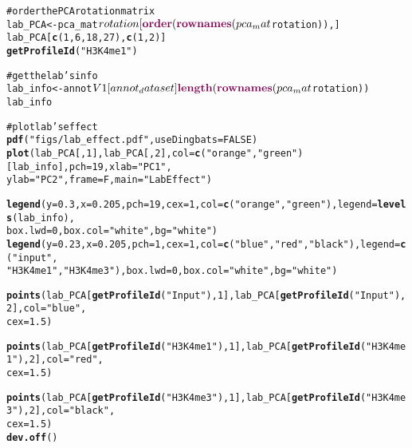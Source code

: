 \documentclass{article}\usepackage{graphicx, color}
\makeatletter
\newcommand{\hlfunctioncall}[1]{\textcolor[rgb]{0.501960784313725,0,0.329411764705882}{\textbf{#1}}}%
\newcommand{\hlstring}[1]{\textcolor[rgb]{0.6,0.6,1}{#1}}%
\newcommand{\hlcomment}[1]{\textcolor[rgb]{0.180392156862745,0.6,0.341176470588235}{#1}}%
\newenvironment{kframe}{%
 \def\at@end@of@kframe{}%
 \ifinner\ifhmode%
  \def\at@end@of@kframe{\end{minipage}}%
  \begin{minipage}{\columnwidth}%
 \fi\fi%
 \def\FrameCommand##1{\hskip\@totalleftmargin \hskip-\fboxsep
 \colorbox{shadecolor}{##1}\hskip-\fboxsep
     \hskip-\linewidth \hskip-\@totalleftmargin \hskip\columnwidth}%
 \MakeFramed {\advance\hsize-\width
   \@totalleftmargin\z@ \linewidth\hsize
   \@setminipage}}%
 {\par\unskip\endMakeFramed%
 \at@end@of@kframe}
\newenvironment{knitrout}{}{} %
\makeatother
\begin{document}
\begin{knitrout}
\color{fgcolor}\begin{kframe}
\begin{alltt}
\hlcomment{# order the PCA rotation matrix}
lab_PCA <- pca_mat$rotation[\hlfunctioncall{order}(\hlfunctioncall{rownames}(pca_mat$rotation)), ]
lab_PCA[\hlfunctioncall{c}(1, 6, 18, 27), \hlfunctioncall{c}(1, 2)]
\hlfunctioncall{getProfileId}(\hlstring{"H3K4me1"})

\hlcomment{# get the lab's info}
lab_info <- annot$V1[annot_dataset]
\hlfunctioncall{length}(\hlfunctioncall{rownames}(pca_mat$rotation))
lab_info

\hlcomment{# plot lab's effect}
\hlfunctioncall{pdf}(\hlstring{"figs/lab_effect.pdf"}, useDingbats = FALSE)
\hlfunctioncall{plot}(lab_PCA[, 1], lab_PCA[, 2], col = \hlfunctioncall{c}(\hlstring{"orange"}, \hlstring{"green"})[lab_info], pch = 19, xlab = \hlstring{"PC1"}, 
    ylab = \hlstring{"PC2"}, frame = F, main = \hlstring{"Lab Effect"})

\hlfunctioncall{legend}(y = 0.3, x = 0.205, pch = 19, cex = 1, col = \hlfunctioncall{c}(\hlstring{"orange"}, \hlstring{"green"}), legend = \hlfunctioncall{levels}(lab_info), 
    box.lwd = 0, box.col = \hlstring{"white"}, bg = \hlstring{"white"})
\hlfunctioncall{legend}(y = 0.23, x = 0.205, pch = 1, cex = 1, col = \hlfunctioncall{c}(\hlstring{"blue"}, \hlstring{"red"}, \hlstring{"black"}), legend = \hlfunctioncall{c}(\hlstring{"input"}, 
    \hlstring{"H3K4me1"}, \hlstring{"H3K4me3"}), box.lwd = 0, box.col = \hlstring{"white"}, bg = \hlstring{"white"})

\hlfunctioncall{points}(lab_PCA[\hlfunctioncall{getProfileId}(\hlstring{"Input"}), 1], lab_PCA[\hlfunctioncall{getProfileId}(\hlstring{"Input"}), 2], col = \hlstring{"blue"}, 
    cex = 1.5)

\hlfunctioncall{points}(lab_PCA[\hlfunctioncall{getProfileId}(\hlstring{"H3K4me1"}), 1], lab_PCA[\hlfunctioncall{getProfileId}(\hlstring{"H3K4me1"}), 2], col = \hlstring{"red"}, 
    cex = 1.5)

\hlfunctioncall{points}(lab_PCA[\hlfunctioncall{getProfileId}(\hlstring{"H3K4me3"}), 1], lab_PCA[\hlfunctioncall{getProfileId}(\hlstring{"H3K4me3"}), 2], col = \hlstring{"black"}, 
    cex = 1.5)
\hlfunctioncall{dev.off}()

\end{alltt}
\end{kframe}
\end{knitrout}
\end{document}
